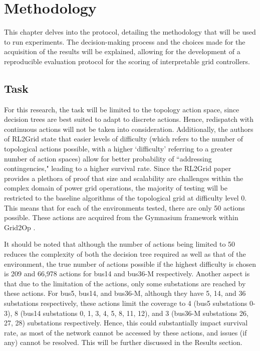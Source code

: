 \chapter{Methodology}
\label{ch:Methodology}

This chapter delves into the protocol, detailing the methodology that will be used to run experiments. The decision-making process and the choices made for the acquisition of the results will be explained, allowing for the development of a reproducible evaluation protocol for the scoring of interpretable grid controllers.

\section{Task}

For this research, the task will be limited to the topology action space, since decision trees are best suited to adapt to discrete actions. Hence, redispatch with continuous actions will not be taken into consideration. Additionally, the authors of RL2Grid \cite{marchesini2025rl2grid} state that easier levels of difficulty (which refers to the number of topological actions possible, with a higher `difficulty' referring to a greater number of action spaces) allow for better probability of ``addressing contingencies," leading to a higher survival rate. Since the RL2Grid paper provides a plethora of proof that size and scalability are challenges within the complex domain of power grid operations, the majority of testing will be restricted to the baseline algorithms of the topological grid at difficulty level 0. This means that for each of the environments tested, there are only 50 actions possible. These actions are acquired from the Gymnasium framework within Grid2Op \cite{marot2021learning}.

It should be noted that although the number of actions being limited to 50 reduces the complexity of both the decision tree required as well as that of the environment, the true number of actions possible if the highest difficulty is chosen is 209 and 66,978 actions for bus14 and bus36-M respectively. Another aspect is that due to the limitation of the actions, only some substations are reached by these actions. For bus5, bus14, and bus36-M, although they have 5, 14, and 36 substations respectively, these actions limit the coverage to 4 (bus5 substations 0-3), 8 (bus14 substations 0, 1, 3, 4, 5, 8, 11, 12), and 3 (bus36-M substations 26, 27, 28) substations respectively. Hence, this could substantially impact survival rate, as most of the network cannot be accessed by these actions, and issues (if any) cannot be resolved. This will be further discussed in the Results section.

